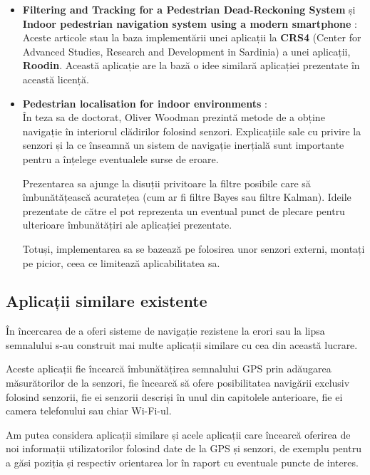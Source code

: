 \documentclass[12pt,a4paper]{article}
\begin{document}
\begin{itemize}
\item \textbf{Filtering and Tracking for a Pedestrian Dead-Reckoning System} \cite{SDCPA10b} și \textbf{Indoor pedestrian navigation system using a modern smartphone} \cite{SCM10}:\\
Aceste articole stau la baza implementării unei aplicații la \textbf{CRS4} (Center for Advanced Studies, Research and Development in Sardinia) a unei aplicații, \textbf{Roodin}. Această aplicație are la bază o idee similară aplicației prezentate în această licență.

\item \textbf{Pedestrian localisation for indoor environments} \cite{OliverWoodman}:\\
În teza sa de doctorat, Oliver Woodman prezintă metode de a obține navigație în interiorul clădirilor folosind senzori. Explicațiile sale cu privire la senzori și la ce înseamnă un sistem de navigație inerțială sunt importante pentru a înțelege eventualele surse de eroare.

Prezentarea sa ajunge la disuții privitoare la filtre posibile care să îmbunătățească acuratețea (cum ar fi filtre Bayes sau filtre Kalman). Ideile prezentate de către el pot reprezenta un eventual punct de plecare pentru ulterioare îmbunătățiri ale aplicației prezentate.

Totuși, implementarea sa se bazează pe folosirea unor senzori externi, montați pe picior, ceea ce limitează aplicabilitatea sa.

\end{itemize}


\subsection{Aplicații similare existente}
În încercarea de a oferi sisteme de navigație rezistene la erori sau la lipsa semnalului s-au construit mai multe aplicații similare cu cea din această lucrare.

Aceste aplicații fie încearcă îmbunătățirea semnalului GPS prin adăugarea măsurătorilor de la senzori, fie încearcă să ofere posibilitatea navigării exclusiv folosind senzorii, fie ei senzorii descriși în unul din capitolele anterioare, fie ei camera telefonului sau chiar Wi-Fi-ul.

Am putea considera aplicații similare și acele aplicații care încearcă oferirea de noi informații utilizatorilor folosind date de la GPS și senzori, de exemplu pentru a găsi poziția și respectiv orientarea lor în raport cu eventuale puncte de interes.
\end{document}
